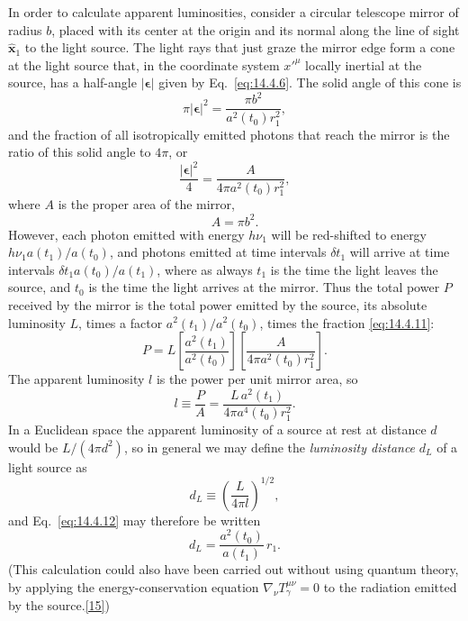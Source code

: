 In order to calculate apparent luminosities, consider a circular telescope
mirror of radius \(b\), placed with its center at the origin and its normal
along the line of sight \(\widehat{\mathbf{x}}_1\) to the light source. The
light rays that just graze the mirror edge form a cone at the light source
that, in the coordinate system \(x'^\mu\) locally inertial at the source,
has a half-angle \(\lvert\boldsymbol{\epsilon}\rvert\) given by
Eq.~\eqref{eq:14.4.6}. The solid angle of this cone is
\[
  \pi\lvert\boldsymbol{\epsilon}\rvert^2
  =
  \frac{\pi b^2}{a^2(t_0)r_1^2},
\]
and the fraction of all isotropically emitted photons that reach the mirror
is the ratio of this solid angle to \(4\pi\), or
\begin{equation}
  \frac{\lvert\boldsymbol{\epsilon}\rvert^2}{4}
  =
  \frac{A}{4\pi a^2(t_0)r_1^2},
  \tag{14.4.11}\label{eq:14.4.11}
\end{equation}
where \(A\) is the proper area of the mirror,
\[
  A=\pi b^2.
\]
However, each photon emitted with energy \(h\nu_1\) will be red-shifted to
energy \(h\nu_1a(t_1)/a(t_0)\), and photons emitted at time intervals
\(\delta t_1\) will arrive at time intervals
\(\delta t_1a(t_0)/a(t_1)\), where as always \(t_1\) is the time the light
leaves the source, and \(t_0\) is the time the light arrives at the mirror.
Thus the total power \(P\) received by the mirror is the total power emitted
by the source, its absolute luminosity \(L\), times a factor
\(a^2(t_1)/a^2(t_0)\), times the fraction \eqref{eq:14.4.11}:
\[
  P
  =
  L
  \left[\frac{a^2(t_1)}{a^2(t_0)}\right]
  \left[\frac{A}{4\pi a^2(t_0)r_1^2}\right].
\]
The apparent luminosity \(l\) is the power per unit mirror area, so
\begin{equation}
  l
  \equiv
  \frac{P}{A}
  =
  \frac{L\,a^2(t_1)}{4\pi a^4(t_0)r_1^2}.
  \tag{14.4.12}\label{eq:14.4.12}
\end{equation}
In a Euclidean space the apparent luminosity of a source at rest at distance
\(d\) would be \(L/(4\pi d^2)\), so in general we may define the
\emph{luminosity distance} \(d_L\) of a light source as
\begin{equation}
  d_L\equiv\left(\frac{L}{4\pi l}\right)^{1/2},
  \tag{14.4.13}\label{eq:14.4.13}
\end{equation}
and Eq.~\eqref{eq:14.4.12} may therefore be written
\begin{equation}
  d_L=\frac{a^2(t_0)}{a(t_1)}\,r_1.
  \tag{14.4.14}\label{eq:14.4.14}
\end{equation}
(This calculation could also have been carried out without using quantum
theory, by applying the energy-conservation equation
\(\nabla_\nu T_\gamma^{\mu\nu}=0\) to the radiation emitted by the
source.\hyperref[ch14-ref-15]{[15]})


